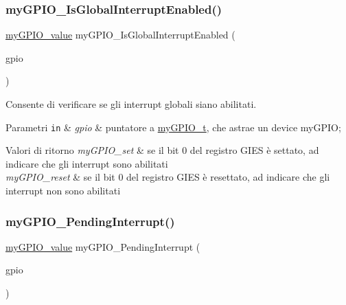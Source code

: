 \subsubsection{\texorpdfstring{my\+G\+P\+I\+O\+\_\+\+Is\+Global\+Interrupt\+Enabled()}{myGPIO\_IsGlobalInterruptEnabled()}}
{\footnotesize\ttfamily \hyperlink{group__bare-metal_gaf634fe4a0e1eab8da5000b72d6ad362b}{my\+G\+P\+I\+O\+\_\+value} my\+G\+P\+I\+O\+\_\+\+Is\+Global\+Interrupt\+Enabled (\begin{DoxyParamCaption}\item[{\hyperlink{structmy_g_p_i_o__t}{my\+G\+P\+I\+O\+\_\+t} $\ast$}]{gpio }\end{DoxyParamCaption})}



Consente di verificare se gli interrupt globali siano abilitati. 


\begin{DoxyParams}[1]{Parametri}
\mbox{\tt in}  & {\em gpio} & puntatore a \hyperlink{structmy_g_p_i_o__t}{my\+G\+P\+I\+O\+\_\+t}, che astrae un device my\+G\+P\+IO; \\
\hline
\end{DoxyParams}

\begin{DoxyRetVals}{Valori di ritorno}
{\em my\+G\+P\+I\+O\+\_\+set} & se il bit 0 del registro G\+I\+ES è settato, ad indicare che gli interrupt sono abilitati \\
\hline
{\em my\+G\+P\+I\+O\+\_\+reset} & se il bit 0 del registro G\+I\+ES è resettato, ad indicare che gli interrupt non sono abilitati \\
\hline
\end{DoxyRetVals}
\mbox{\label{group__bare-metal_ga386cea84aca8c6bb731b4b46fcbf9199}} 
\subsubsection{\texorpdfstring{my\+G\+P\+I\+O\+\_\+\+Pending\+Interrupt()}{myGPIO\_PendingInterrupt()}}
{\footnotesize\ttfamily \hyperlink{group__bare-metal_gaf634fe4a0e1eab8da5000b72d6ad362b}{my\+G\+P\+I\+O\+\_\+value} my\+G\+P\+I\+O\+\_\+\+Pending\+Interrupt (\begin{DoxyParamCaption}\item[{\hyperlink{structmy_g_p_i_o__t}{my\+G\+P\+I\+O\+\_\+t} $\ast$}]{gpio }\end{DoxyParamCaption})}




